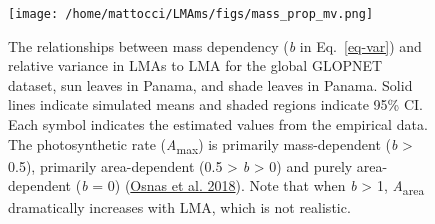 \documentclass[
  12pt,
  a4paper,
,tablecaptionabove
]{scrartcl}
\begin{document}
\newpage

\begin{figure}

{\centering \texttt{[image: /home/mattocci/LMAms/figs/mass\_prop\_mv.png]}

}

\caption{\label{fig-massplt}The relationships between mass dependency
(\emph{b} in Eq.~\ref{eq-var}) and relative variance in LMAs to LMA for
the global GLOPNET dataset, sun leaves in Panama, and shade leaves in
Panama. Solid lines indicate simulated means and shaded regions indicate
95\% CI. Each symbol indicates the estimated values from the empirical
data. The photosynthetic rate (\emph{A}\textsubscript{max}) is primarily
mass-dependent (\emph{b} \textgreater{} 0.5), primarily area-dependent
(0.5 \textgreater{} \emph{b} \textgreater{} 0) and purely area-dependent
(\emph{b} = 0) (\protect\hyperlink{ref-Osnas2018}{Osnas et al. 2018}).
Note that when \emph{b} \textgreater{} 1, \emph{A}\textsubscript{area}
dramatically increases with LMA, which is not realistic.}

\end{figure}

\newpage
\end{document}
